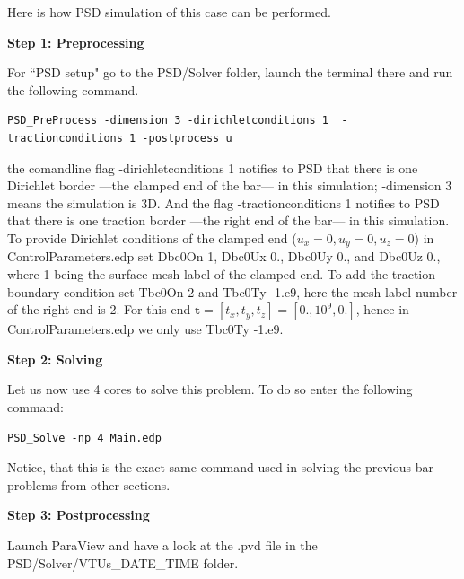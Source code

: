 \documentclass{report}
\begin{document}
Here is how PSD simulation of this case can be performed.

\textbf{Step 1: Preprocessing}

For ``PSD setup" go to the {\ttfamily PSD/Solver} folder, launch the terminal there and run the following command.
\begin{lstlisting}[style=Linux]
PSD_PreProcess -dimension 3 -dirichletconditions 1  -tractionconditions 1 -postprocess u
\end{lstlisting}
%
the comandline flag {\ttfamily -dirichletconditions 1} notifies to PSD that there is one Dirichlet border ---the clamped end of the bar--- in this simulation; {\ttfamily -dimension 3} means the simulation is 3D. And the flag {\ttfamily -tractionconditions 1} notifies to PSD that there is one traction border ---the right end of the bar--- in this simulation. 
To provide Dirichlet conditions of the  clamped end ($u_x=0,u_y=0,u_z=0$) in {\ttfamily ControlParameters.edp} set {\ttfamily Dbc0On 1}, {\ttfamily Dbc0Ux 0.}, {\ttfamily Dbc0Uy 0.}, and {\ttfamily Dbc0Uz 0.}, where 1 being the surface mesh label of the clamped end. To add the traction boundary condition set  {\ttfamily Tbc0On 2} and {\ttfamily Tbc0Ty -1.e9}, here the mesh label number of the right end is 2. For this end $\mathbf t=[t_x,t_y,t_z]=[0.,10^9,0.]$, hence in {\ttfamily ControlParameters.edp} we only  use {\ttfamily Tbc0Ty -1.e9}. 


\textbf{Step 2: Solving}

Let us now use 4 cores to solve this problem. To do so enter the following command:

\begin{lstlisting}[style=Linux]
PSD_Solve -np 4 Main.edp
\end{lstlisting}
%
Notice, that this is the exact same command used in solving the previous bar problems from other sections.


\textbf{Step 3: Postprocessing}

Launch ParaView and have a look at the  {\ttfamily .pvd} file in the  {\ttfamily PSD/Solver/VTUs\_DATE\_TIME} folder. 
\end{document}
